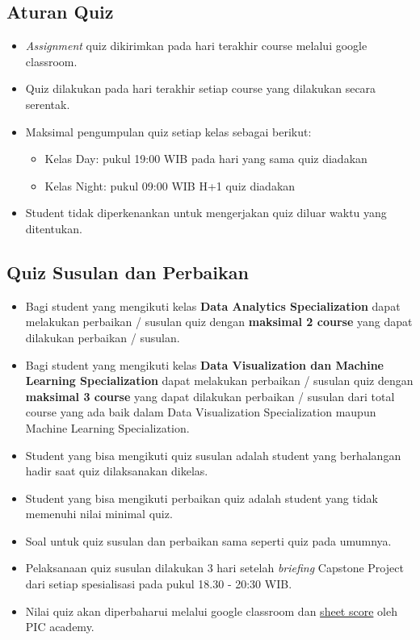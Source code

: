 \documentclass[
]{book}
\providecommand{\tightlist}{%
  \setlength{\itemsep}{0pt}\setlength{\parskip}{0pt}}
\begin{document}
\hypertarget{aturan-quiz}{%
\subsection{Aturan Quiz}\label{aturan-quiz}}

\begin{itemize}
\item
  \emph{Assignment} quiz dikirimkan pada hari terakhir course melalui google classroom.
\item
  Quiz dilakukan pada hari terakhir setiap course yang dilakukan secara serentak.
\item
  Maksimal pengumpulan quiz setiap kelas sebagai berikut:

  \begin{itemize}
  \tightlist
  \item
    Kelas Day: pukul 19:00 WIB pada hari yang sama quiz diadakan
  \item
    Kelas Night: pukul 09:00 WIB H+1 quiz diadakan
  \end{itemize}
\item
  Student tidak diperkenankan untuk mengerjakan quiz diluar waktu yang ditentukan.
\end{itemize}

\hypertarget{quiz-susulan-dan-perbaikan}{%
\subsection{Quiz Susulan dan Perbaikan}\label{quiz-susulan-dan-perbaikan}}

\begin{itemize}
\tightlist
\item
  Bagi student yang mengikuti kelas \textbf{Data Analytics Specialization} dapat melakukan perbaikan / susulan quiz dengan \textbf{maksimal 2 course} yang dapat dilakukan perbaikan / susulan.
\item
  Bagi student yang mengikuti kelas \textbf{Data Visualization dan Machine Learning Specialization} dapat melakukan perbaikan / susulan quiz dengan \textbf{maksimal 3 course} yang dapat dilakukan perbaikan / susulan dari total course yang ada baik dalam Data Visualization Specialization maupun Machine Learning Specialization.
\item
  Student yang bisa mengikuti quiz susulan adalah student yang berhalangan hadir saat quiz dilaksanakan dikelas.
\item
  Student yang bisa mengikuti perbaikan quiz adalah student yang tidak memenuhi nilai minimal quiz.
\item
  Soal untuk quiz susulan dan perbaikan sama seperti quiz pada umumnya.
\item
  Pelaksanaan quiz susulan dilakukan 3 hari setelah \emph{briefing} Capstone Project dari setiap spesialisasi pada pukul 18.30 - 20:30 WIB.
\item
  Nilai quiz akan diperbaharui melalui google classroom dan \href{https://docs.google.com/spreadsheets/d/1cGJ0pn9k9gKCBnceWVwaL9D7BBDMNjLh8uPYlaBlJi8/edit?usp=sharing}{sheet score} oleh PIC academy.
\end{itemize}
\end{document}
